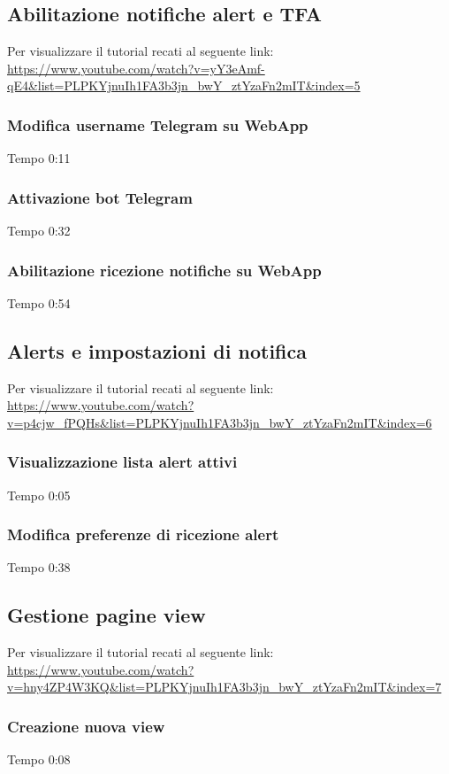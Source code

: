 \subsection{Abilitazione notifiche alert e TFA}
Per visualizzare il tutorial recati al seguente link: 
\url{https://www.youtube.com/watch?v=yY3eAmf-qE4&list=PLPKYjnuIh1FA3b3jn_bwY_ztYzaFn2mIT&index=5}

	\subsubsection{Modifica username Telegram su WebApp}
	Tempo 0:11

	\subsubsection{Attivazione bot Telegram}
	Tempo 0:32

	\subsubsection{Abilitazione ricezione notifiche su WebApp}
	Tempo 0:54

\subsection{Alerts e impostazioni di notifica}
Per visualizzare il tutorial recati al seguente link: 
\url{https://www.youtube.com/watch?v=p4cjw_fPQHs&list=PLPKYjnuIh1FA3b3jn_bwY_ztYzaFn2mIT&index=6}

	\subsubsection{Visualizzazione lista alert attivi}
	Tempo 0:05

	\subsubsection{Modifica preferenze di ricezione alert}
	Tempo 0:38


\subsection{Gestione pagine view}
Per visualizzare il tutorial recati al seguente link: 
\url{https://www.youtube.com/watch?v=hny4ZP4W3KQ&list=PLPKYjnuIh1FA3b3jn_bwY_ztYzaFn2mIT&index=7}

	\subsubsection{Creazione nuova view}
	Tempo 0:08

